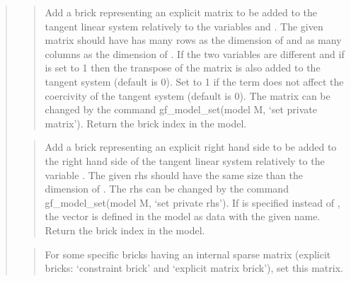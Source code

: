 \documentclass[a4paper,11pt,english]{sphinxmanual}
\begin{document}
\begin{quote}
\sphinxAtStartPar
{}
\begin{quote}

\sphinxAtStartPar
Add a brick representing an explicit matrix to be added to the tangent
linear system relatively to the variables  and .
The given matrix should have has many rows as the dimension of
 and as many columns as the dimension of .
If the two variables are different and if  is set to 1
then the transpose of the matrix is also added to the tangent system
(default is 0). Set  to 1 if the term does not affect the
coercivity of the tangent system (default is 0). The matrix can be
changed by the command gf\_model\_set(model M, ‘set private matrix’). Return the
brick index in the model.
\end{quote}

\sphinxAtStartPar
{}
\begin{quote}

\sphinxAtStartPar
Add a brick representing an explicit right hand side to be added to
the right hand side of the tangent linear system relatively to the
variable . The given rhs should have the same size than the
dimension of . The rhs can be changed by the command
gf\_model\_set(model M, ‘set private rhs’). If  is specified instead of
, the vector  is defined in the model as data with the given name.
Return the brick index in the model.
\end{quote}

\sphinxAtStartPar
{}
\begin{quote}

\sphinxAtStartPar
For some specific bricks having an internal sparse matrix
(explicit bricks: ‘constraint brick’ and ‘explicit matrix brick’),
set this matrix.
\end{quote}

\sphinxAtStartPar
{}
\begin{quote}


\end{quote}
\end{quote}
\end{document}
